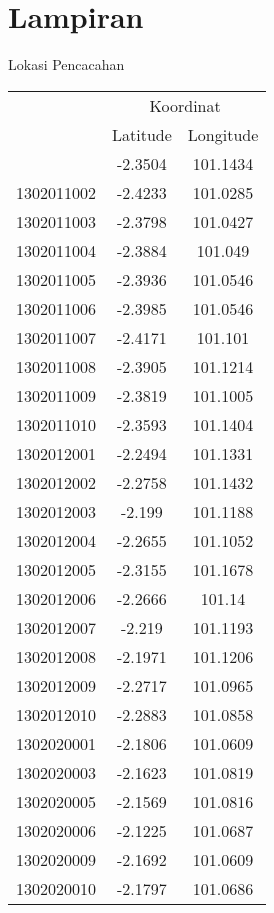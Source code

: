 \chapter{Lampiran}

\begin{table*}\centering
\caption{Lokasi Pencacahan}
\label{tbl:enumeration_locations_full}
\end{table*}

\begin{longtable}{@{}lcc@{}}
\toprule
& \multicolumn{2}{c}{Koordinat}\\
\cmidrule{2-3}
& Latitude & Longitude\\ 
\midrule
\endhead
\bottomrule
\endfoot
1302011001 & -2.3504 & 101.1434\\ 
1302011002 & -2.4233 & 101.0285\\ 
1302011003 & -2.3798 & 101.0427\\ 
1302011004 & -2.3884 & 101.049\\ 
1302011005 & -2.3936 & 101.0546\\ 
1302011006 & -2.3985 & 101.0546\\ 
1302011007 & -2.4171 & 101.101\\ 
1302011008 & -2.3905 & 101.1214\\ 
1302011009 & -2.3819 & 101.1005\\ 
1302011010 & -2.3593 & 101.1404\\ 
1302012001 & -2.2494 & 101.1331\\ 
1302012002 & -2.2758 & 101.1432\\ 
1302012003 & -2.199 & 101.1188\\ 
1302012004 & -2.2655 & 101.1052\\ 
1302012005 & -2.3155 & 101.1678\\ 
1302012006 & -2.2666 & 101.14\\ 
1302012007 & -2.219 & 101.1193\\ 
1302012008 & -2.1971 & 101.1206\\ 
1302012009 & -2.2717 & 101.0965\\ 
1302012010 & -2.2883 & 101.0858\\ 
1302020001 & -2.1806 & 101.0609\\ 
1302020003 & -2.1623 & 101.0819\\ 
1302020005 & -2.1569 & 101.0816\\ 
1302020006 & -2.1225 & 101.0687\\ 
1302020009 & -2.1692 & 101.0609\\ 
1302020010 & -2.1797 & 101.0686\\ 

\end{longtable}

